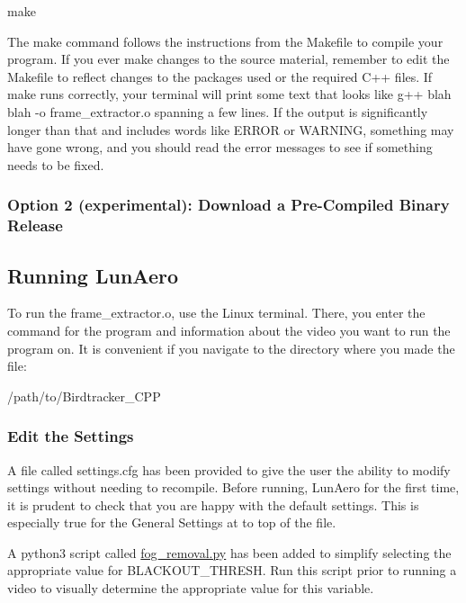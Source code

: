 \begin{DoxyCode}
make
\end{DoxyCode}


The {\ttfamily make} command follows the instructions from the {\ttfamily Makefile} to compile your program. If you ever make changes to the source material, remember to edit the {\ttfamily Makefile} to reflect changes to the packages used or the required C++ files. If {\ttfamily make} runs correctly, your terminal will print some text that looks like {\ttfamily g++ blah blah -\/o frame\+\_\+extractor.\+o} spanning a few lines. If the output is significantly longer than that and includes words like E\+R\+R\+OR or W\+A\+R\+N\+I\+NG, something may have gone wrong, and you should read the error messages to see if something needs to be fixed.

\subsubsection*{Option 2 (experimental)\+: Download a Pre-\/\+Compiled Binary Release}

\subsection*{Running Lun\+Aero}

To run the {\ttfamily frame\+\_\+extractor.\+o}, use the Linux terminal. There, you enter the command for the program and information about the video you want to run the program on. It is convenient if you navigate to the directory where you made the file\+:


\begin{DoxyCode}
/path/to/Birdtracker\_CPP
\end{DoxyCode}


\subsubsection*{Edit the Settings}

A file called {\ttfamily settings.\+cfg} has been provided to give the user the ability to modify settings without needing to recompile. Before running, Lun\+Aero for the first time, it is prudent to check that you are happy with the default settings. This is especially true for the General Settings at to top of the file.

A python3 script called {\ttfamily \hyperlink{fog__removal_8py}{fog\+\_\+removal.\+py}} has been added to simplify selecting the appropriate value for B\+L\+A\+C\+K\+O\+U\+T\+\_\+\+T\+H\+R\+E\+SH. Run this script prior to running a video to visually determine the appropriate value for this variable.

